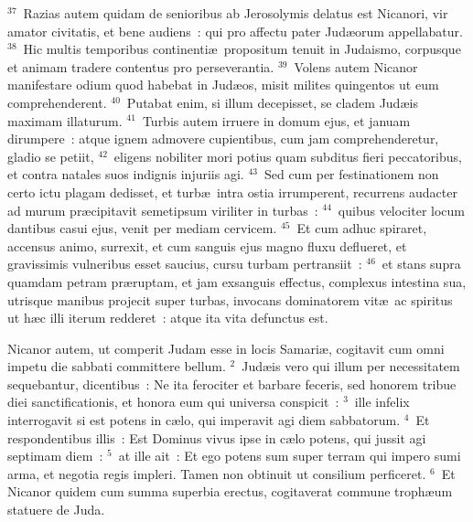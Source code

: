 ${}^{37}$~Razias autem quidam de senioribus ab Jerosolymis delatus est Nicanori, vir amator civitatis, et bene audiens~: qui pro affectu pater Jud\ae orum appellabatur.
${}^{38}$~Hic multis temporibus continenti\ae\ propositum tenuit in Judaismo, corpusque et animam tradere contentus pro perseverantia.
${}^{39}$~Volens autem Nicanor manifestare odium quod habebat in Jud\ae os, misit milites quingentos ut eum comprehenderent.
${}^{40}$~Putabat enim, si illum decepisset, se cladem Jud\ae is maximam illaturum.
${}^{41}$~Turbis autem irruere in domum ejus, et januam dirumpere~: atque ignem admovere cupientibus, cum jam comprehenderetur, gladio se petiit,
${}^{42}$~eligens nobiliter mori potius quam subditus fieri peccatoribus, et contra natales suos indignis injuriis agi.
${}^{43}$~Sed cum per festinationem non certo ictu plagam dedisset, et turb\ae\ intra ostia irrumperent, recurrens audacter ad murum pr\ae cipitavit semetipsum viriliter in turbas~:
${}^{44}$~quibus velociter locum dantibus casui ejus, venit per mediam cervicem.
${}^{45}$~Et cum adhuc spiraret, accensus animo, surrexit, et cum sanguis ejus magno fluxu deflueret, et gravissimis vulneribus esset saucius, cursu turbam pertransiit~:
${}^{46}$~et stans supra quamdam petram pr\ae ruptam, et jam exsanguis effectus, complexus intestina sua, utrisque manibus projecit super turbas, invocans dominatorem vit\ae\ ac spiritus ut h\ae c illi iterum redderet~: atque ita vita defunctus est.

\bchapter
\lettrine[lines=3,image=true,loversize=0.05,lraise=-0.03]{N}{}icanor autem, ut comperit Judam esse in locis Samari\ae , cogitavit cum omni impetu die sabbati committere bellum.
${}^{2}$~Jud\ae is vero qui illum per necessitatem sequebantur, dicentibus~: Ne ita ferociter et barbare feceris, sed honorem tribue diei sanctificationis, et honora eum qui universa conspicit~:
${}^{3}$~ille infelix interrogavit si est potens in c\ae lo, qui imperavit agi diem sabbatorum.
${}^{4}$~Et respondentibus illis~: Est Dominus vivus ipse in c\ae lo potens, qui jussit agi septimam diem~:
${}^{5}$~at ille ait~: Et ego potens sum super terram qui impero sumi arma, et negotia regis impleri. Tamen non obtinuit ut consilium perficeret.
${}^{6}$~Et Nicanor quidem cum summa superbia erectus, cogitaverat commune troph\ae um statuere de Juda.


